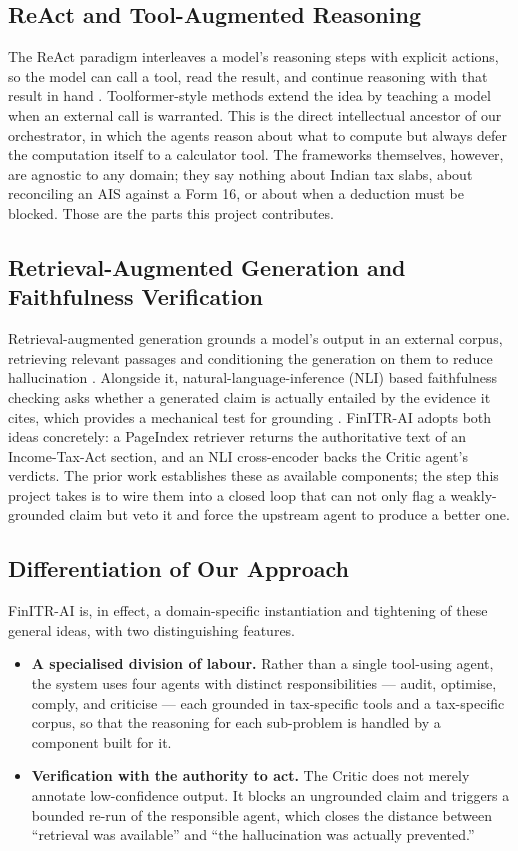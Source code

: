 \documentclass[12pt, a4paper, oneside]{report}
\begin{document}
\subsection{ReAct and Tool-Augmented Reasoning}
The ReAct paradigm interleaves a model's reasoning steps with explicit actions,
so the model can call a tool, read the result, and continue reasoning with that
result in hand \cite{ref7}. Toolformer-style methods extend the idea by teaching
a model when an external call is warranted. This is the direct intellectual
ancestor of our orchestrator, in which the agents reason about what to compute
but always defer the computation itself to a calculator tool. The frameworks
themselves, however, are agnostic to any domain; they say nothing about Indian
tax slabs, about reconciling an AIS against a Form 16, or about when a deduction
must be blocked. Those are the parts this project contributes.

\subsection{Retrieval-Augmented Generation and Faithfulness Verification}
Retrieval-augmented generation grounds a model's output in an external corpus,
retrieving relevant passages and conditioning the generation on them to reduce
hallucination \cite{ref8}. Alongside it, natural-language-inference (NLI) based
faithfulness checking asks whether a generated claim is actually entailed by the
evidence it cites, which provides a mechanical test for grounding \cite{ref9}.
FinITR-AI adopts both ideas concretely: a PageIndex retriever returns the
authoritative text of an Income-Tax-Act section, and an NLI cross-encoder backs
the Critic agent's verdicts. The prior work establishes these as available
components; the step this project takes is to wire them into a closed loop that
can not only flag a weakly-grounded claim but veto it and force the upstream
agent to produce a better one.

\subsection{Differentiation of Our Approach}
FinITR-AI is, in effect, a domain-specific instantiation and tightening of these
general ideas, with two distinguishing features.

\begin{itemize}
    \item \textbf{A specialised division of labour.} Rather than a single
          tool-using agent, the system uses four agents with distinct
          responsibilities --- audit, optimise, comply, and criticise --- each
          grounded in tax-specific tools and a tax-specific corpus, so that the
          reasoning for each sub-problem is handled by a component built for it.
    \item \textbf{Verification with the authority to act.} The Critic does not
          merely annotate low-confidence output. It blocks an ungrounded claim
          and triggers a bounded re-run of the responsible agent, which closes
          the distance between ``retrieval was available'' and ``the
          hallucination was actually prevented.''
\end{itemize}
\end{document}
